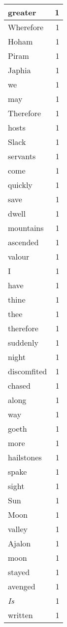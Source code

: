 \begin{center}
\begin{longtable}{l|r}
greater & 1 \\ \hline
Wherefore & 1 \\ \hline
Hoham & 1 \\ \hline
Piram & 1 \\ \hline
Japhia & 1 \\ \hline
we & 1 \\ \hline
may & 1 \\ \hline
Therefore & 1 \\ \hline
hosts & 1 \\ \hline
Slack & 1 \\ \hline
servants & 1 \\ \hline
come & 1 \\ \hline
quickly & 1 \\ \hline
save & 1 \\ \hline
dwell & 1 \\ \hline
mountains & 1 \\ \hline
ascended & 1 \\ \hline
valour & 1 \\ \hline
I & 1 \\ \hline
have & 1 \\ \hline
thine & 1 \\ \hline
thee & 1 \\ \hline
therefore & 1 \\ \hline
suddenly & 1 \\ \hline
night & 1 \\ \hline
discomfited & 1 \\ \hline
chased & 1 \\ \hline
along & 1 \\ \hline
way & 1 \\ \hline
goeth & 1 \\ \hline
more & 1 \\ \hline
hailstones & 1 \\ \hline
spake & 1 \\ \hline
sight & 1 \\ \hline
Sun & 1 \\ \hline
Moon & 1 \\ \hline
valley & 1 \\ \hline
Ajalon & 1 \\ \hline
moon & 1 \\ \hline
stayed & 1 \\ \hline
avenged & 1 \\ \hline
\emph{Is} & 1 \\ \hline
written & 1 \\ \hline

\end{longtable}
\end{center}
